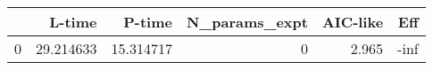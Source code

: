 \begin{tabular}{lrrrrr}
\toprule
{} &     L-time &     P-time &  N\_params\_expt &  AIC-like &  Eff \\
\midrule
0 &  29.214633 &  15.314717 &              0 &     2.965 & -inf \\
\bottomrule
\end{tabular}

